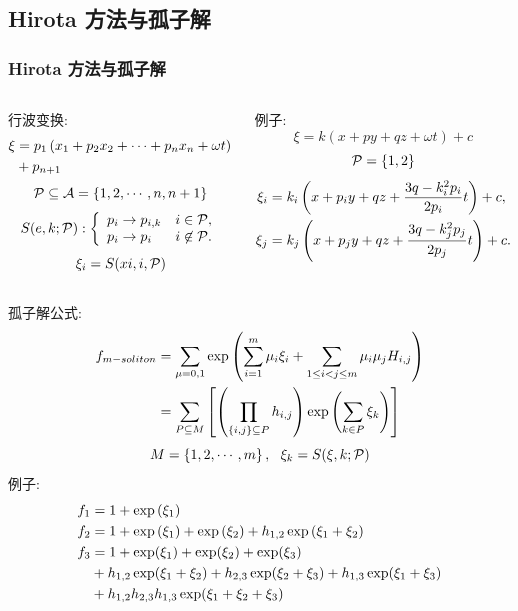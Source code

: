 \subsection{Hirota 方法与孤子解}
\begin{frame}
\frametitle{Hirota 方法与孤子解}
\begin{columns}
\small 
\begin{column}{0.5\textwidth}
行波变换:
\[
\begin{split}
    \xi&=p_1\left(x_1+p_2x_2+\cdots+p_nx_n+\omega t\right) \\ 
    &+p_{n+1}
\end{split}
\]
\[
    \mathcal{P}\subseteq  \mathcal{A}=\left\{1,2,\cdots,n,n+1\right\}
\]
\[
    S(e,k;\mathcal{P}): \left\{\begin{array}{ll}
        p_i \rightarrow p_{i,k} & i \in \mathcal{P}, \\ 
        p_i \rightarrow p_i & i \not\in \mathcal{P}.
    \end{array}\right.
\]
\[
    \xi_i=S(xi,i,\mathcal{P})
\]
\end{column}
\begin{column}{0.5\textwidth}
例子:
\[
    \xi=k(x+py+qz+\omega t)+c
\]
\[
    \mathcal{P}=\left\{1,2\right\}
\]
\[
\begin{split}
    \xi_i&=k_i\left(x+p_iy+qz+\frac{3q-k_i^2p_i}{2p_i}t\right)+c, \\ 
    \xi_j&=k_j\left(x+p_jy+qz+\frac{3q-k_j^2p_j}{2p_j}t\right)+c.
\end{split} 
\]
\end{column}
\end{columns}
\end{frame}

\begin{frame}
孤子解公式:
\[
\begin{split}
    f_{m-soliton}&=\sum_{\mu=0,1}\exp\left(\sum_{i=1}^m{\mu_i \xi_i}+\sum_{1\le i<j\le m}{\mu_i\mu_jH_{i,j}}\right) \\ 
    &=\sum_{P\subseteq M}\left[\left(\prod_{\left\{i,j\right\}\subseteq P}{h_{i,j}}\right)\exp\left(\sum_{k\in P}{\xi_k}\right)\right]
\end{split}
\]
\[
    M=\left\{1,2,\cdots,m\right\},~~\xi_k=S(\xi,k;\mathcal{P})
\]
例子:
\[
\begin{split}
    f_1&=1+\exp\left(\xi_1\right) \\ 
    f_2&=1+\exp\left(\xi_1\right)+\exp\left(\xi_2\right)+h_{1,2}\exp\left(\xi_1+\xi_2\right) \\ 
    f_3&=1+\exp(\xi_1)+\exp(\xi_2)+\exp(\xi_3)\\
       &+h_{1,2}\exp(\xi_1+\xi_2)+h_{2,3}\exp(\xi_2+\xi_3)+h_{1,3}\exp(\xi_1+\xi_3)\\
       &+h_{1,2}h_{2,3}h_{1,3}\exp(\xi_1+\xi_2+\xi_3)
\end{split}
\]
\end{frame}

